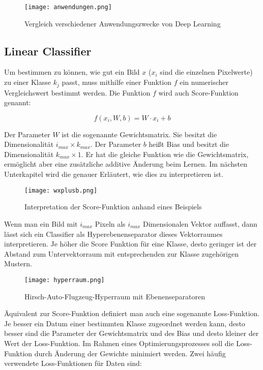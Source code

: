 \documentclass[11pt,fleqn]{book}
\begin{document}
\begin{figure}[h]
\centering
\texttt{[image: anwendungen.png]}
\caption{Vergleich verschiedener Anwendungszwecke von Deep Learning}
\end{figure}

\newpage
\subsection{Linear Classifier}
Um bestimmen zu können, wie gut ein Bild $x$ ($x_i$ sind die einzelnen Pixelwerte) zu einer Klasse $k_j$ passt, muss mithilfe einer Funktion $f$ ein numerischer Vergleichswert bestimmt werden. Die Funktion $f$ wird auch Score-Funktion genannt:

\[f(x_i, W, b) = W \cdot x_i + b \]

Der Parameter $W$ ist die sogenannte Gewichtsmatrix. Sie besitzt die Dimensionalität $i_{max} \times k_{max}$.
Der Parameter $b$ heißt Bias und besitzt die Dimensionalität $k_{max} \times 1$. Er hat die gleiche Funktion wie die Gewichtsmatrix, ermöglicht aber eine zusätzliche additive Änderung beim Lernen. Im nächsten Unterkapitel wird die genauer Erläutert, wie dies zu interpretieren ist.

\begin{figure}[h]
\centering
\texttt{[image: wxplusb.png]}
\caption{Interpretation der Score-Funktion anhand eines Beispiels}
\end{figure}

Wenn man ein Bild mit $i_{max}$ Pixeln als $i_{max}$ Dimensionalen Vektor auffasst, dann lässt sich ein Classifier als Hyperebenenseparator dieses Vektorraumes interpretieren. Je höher die Score Funktion für eine Klasse, desto geringer ist der Abstand zum Untervektorraum mit entsprechenden zur Klasse zugehörigen Mustern.

\begin{figure}[h]
\centering
\texttt{[image: hyperraum.png]}
\caption{Hirsch-Auto-Flugzeug-Hyperraum mit Ebenenseparatoren}
\end{figure}

\newpage
Äquivalent zur Score-Funktion definiert man auch eine sogenannte Loss-Funktion. Je besser ein Datum einer bestimmten Klasse zugeordnet werden kann, desto besser sind die Parameter der Gewichtsmatrix und des Bias und desto kleiner der Wert der Loss-Funktion. Im Rahmen eines Optimierungsprozesses soll die Loss-Funktion durch Änderung der Gewichte minimiert werden.
\bigskip
Zwei häufig verwendete Loss-Funktionen für Daten sind:
\end{document}
